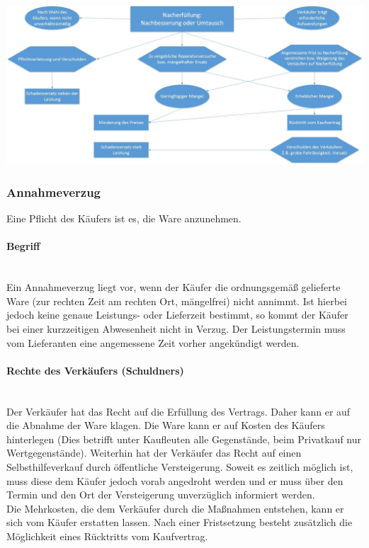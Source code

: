 		\includegraphics[scale=0.3]{pictures/lf01-pic/lf01-Rechte_mangelhafte_Leistung.jpg}\\
		
\subsubsection{Annahmeverzug}
Eine Pflicht des Käufers ist es, die Ware anzunehmen.\\
	\paragraph{Begriff}~\\Ein Annahmeverzug liegt vor, wenn der Käufer die ordnungsgemäß gelieferte Ware (zur rechten Zeit am rechten Ort, mängelfrei) nicht annimmt. Ist hierbei jedoch keine genaue Leistungs- oder Lieferzeit bestimmt, so kommt der Käufer bei einer kurzzeitigen Abwesenheit nicht in Verzug. Der Leistungstermin muss vom Lieferanten eine angemessene Zeit vorher angekündigt werden.
	\paragraph{Rechte des Verkäufers (Schuldners)}~\\Der Verkäufer hat das Recht auf die Erfüllung des Vertrags. Daher kann er auf die Abnahme der Ware klagen. Die Ware kann er auf Kosten des Käufers hinterlegen (Dies betrifft unter Kaufleuten alle Gegenstände, beim Privatkauf nur Wertgegenstände). Weiterhin hat der Verkäufer das Recht auf einen Selbsthilfeverkauf durch öffentliche Versteigerung. Soweit es zeitlich möglich ist, muss diese dem Käufer jedoch vorab angedroht werden und er muss über den Termin und den Ort der Versteigerung unverzüglich informiert werden. \\
Die Mehrkosten, die dem Verkäufer durch die Maßnahmen entstehen, kann er sich vom Käufer erstatten lassen. Nach einer Fristsetzung besteht zusätzlich die Möglichkeit eines Rücktritts vom Kaufvertrag.
